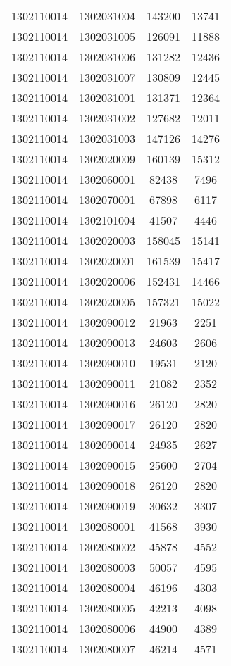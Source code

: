 \begin{longtable}{llcc}
1302110014 & 1302031004 & 143200 & 13741\\
1302110014 & 1302031005 & 126091 & 11888\\
1302110014 & 1302031006 & 131282 & 12436\\
1302110014 & 1302031007 & 130809 & 12445\\
1302110014 & 1302031001 & 131371 & 12364\\
1302110014 & 1302031002 & 127682 & 12011\\
1302110014 & 1302031003 & 147126 & 14276\\
1302110014 & 1302020009 & 160139 & 15312\\
1302110014 & 1302060001 & 82438 & 7496\\
1302110014 & 1302070001 & 67898 & 6117\\
1302110014 & 1302101004 & 41507 & 4446\\
1302110014 & 1302020003 & 158045 & 15141\\
1302110014 & 1302020001 & 161539 & 15417\\
1302110014 & 1302020006 & 152431 & 14466\\
1302110014 & 1302020005 & 157321 & 15022\\
1302110014 & 1302090012 & 21963 & 2251\\
1302110014 & 1302090013 & 24603 & 2606\\
1302110014 & 1302090010 & 19531 & 2120\\
1302110014 & 1302090011 & 21082 & 2352\\
1302110014 & 1302090016 & 26120 & 2820\\
1302110014 & 1302090017 & 26120 & 2820\\
1302110014 & 1302090014 & 24935 & 2627\\
1302110014 & 1302090015 & 25600 & 2704\\
1302110014 & 1302090018 & 26120 & 2820\\
1302110014 & 1302090019 & 30632 & 3307\\
1302110014 & 1302080001 & 41568 & 3930\\
1302110014 & 1302080002 & 45878 & 4552\\
1302110014 & 1302080003 & 50057 & 4595\\
1302110014 & 1302080004 & 46196 & 4303\\
1302110014 & 1302080005 & 42213 & 4098\\
1302110014 & 1302080006 & 44900 & 4389\\
1302110014 & 1302080007 & 46214 & 4571\\

\end{longtable}
